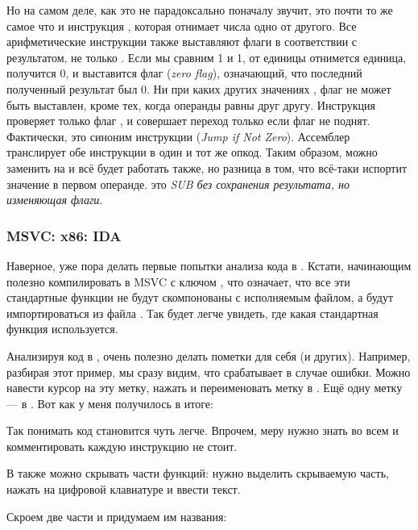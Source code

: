 \label{CMPandSUB}
Но на самом деле, как это не парадоксально поначалу звучит, \CMP это почти то же самое что и инструкция \SUB, которая отнимает числа одно от другого.
Все арифметические инструкции также выставляют флаги в соответствии с результатом, не только \CMP.
Если мы сравним 1 и 1, от единицы отнимется единица, получится 0, и выставится флаг \ZF (\emph{zero flag}), означающий, что последний полученный результат был 0.
Ни при каких других значениях \EAX, флаг \ZF не может быть выставлен, кроме тех, когда операнды равны друг другу.
Инструкция \JNE проверяет только флаг \ZF, и совершает переход только если флаг не поднят. Фактически, \JNE это синоним инструкции \JNZ (\emph{Jump if Not Zero}).
Ассемблер транслирует обе инструкции в один и тот же опкод.
Таким образом, можно \CMP заменить на \SUB и всё будет работать также, но разница в том, что \SUB всё-таки испортит значение в первом операнде.
\CMP это \emph{SUB без сохранения результата, но изменяющая флаги}.

\subsubsection{MSVC: x86: IDA}

Наверное, уже пора делать первые попытки анализа кода в \IDA.
Кстати, начинающим полезно компилировать в MSVC с ключом , что означает, что все эти стандартные
функции не будут скомпонованы с исполняемым файлом, а будут импортироваться из файла .
Так будет легче увидеть, где какая стандартная функция используется.

Анализируя код в \IDA, очень полезно делать пометки для себя (и других).
Например, разбирая этот пример, мы сразу видим, что  срабатывает в случае ошибки.
Можно навести курсор на эту метку, нажать  и переименовать метку в .
Ещё одну метку --- в .
Вот как у меня получилось в итоге:



Так понимать код становится чуть легче.
Впрочем, меру нужно знать во всем и комментировать каждую инструкцию не стоит.

В \IDA также можно скрывать части функций: нужно выделить скрываемую часть, нажать \q{--} на цифровой клавиатуре и ввести текст.

Скроем две части и придумаем им названия:

